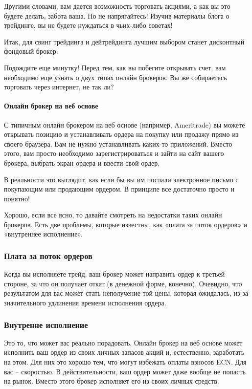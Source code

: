 \documentclass[a5paper]{article}
\begin{document}
Другими словами, вам дается возможность торговать акциями, а как вы это будете делать, забота ваша. Но не напрягайтесь! Изучив материалы блога о трейдинге, вы не будете нуждаться в чьих-либо советах!

Итак, для свинг трейдинга и дейтрейдинга лучшим выбором станет дисконтный фондовый брокер.

Подождите еще минутку! Перед тем, как вы побегите открывать счет, вам
необходимо еще узнать о двух типах онлайн брокеров. Вы же собираетесь
торговать через интернет, не так ли?

\paragraph{Онлайн брокер на веб основе}

С типичным онлайн брокером на веб основе (например, Ameritrade) вы можете открывать позицию и устанавливать ордера на покупку или продажу прямо из своего браузера. Вам не нужно устанавливать каких-то приложений. Вместо этого, вам просто необходимо зарегистрироваться и зайти на сайт вашего брокера, выбрать экран ордера и ввести свой ордер.

В реальности это выглядит, как если бы вы им послали электронное письмо с покупающим или продающим ордером. В принципе все достаточно просто и понятно!

Хорошо, если все ясно, то давайте смотреть на недостатки таких онлайн
брокеров. Есть две проблемы, которые известны, как «плата за поток
ордеров» и «внутреннее исполнение».

\subsubsection{Плата за поток ордеров}

Когда вы исполняете трейд, ваш брокер может направить ордер к третьей
стороне, за что он получает откат (в денежной форме,
конечно). Очевидно, что результатом для вас может стать неполучение
той цены, которая ожидалась, из-за значительного удлинения времени
исполнения ордера.

\subsubsection{Внутренне исполнение}

Это то, что может вас реально порадовать. Онлайн брокер на веб основе может исполнить ваш ордер из своих личных запасов акций и, естественно, заработать на этом. Для них это хорошо тем, что могут избежать оплаты взносов ECN. Для вас – скоростью. В действительности, ваш ордер может даже вообще не попасть на рынок. Вместо этого брокер исполняет его из своих личных средств.
\end{document}
